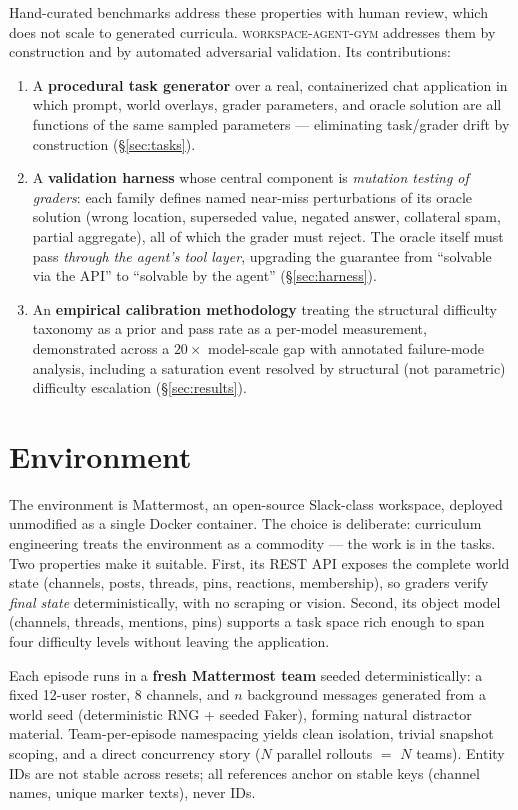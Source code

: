 \documentclass[10pt]{article}
\begin{document}
Hand-curated benchmarks address these properties with human review, which does not scale to generated curricula. \textsc{workspace-agent-gym} addresses them by construction and by automated adversarial validation. Its contributions:

\begin{enumerate}\itemsep0.15em
  \item A \textbf{procedural task generator} over a real, containerized chat application in which prompt, world overlays, grader parameters, and oracle solution are all functions of the same sampled parameters --- eliminating task/grader drift by construction (\S\ref{sec:tasks}).
  \item A \textbf{validation harness} whose central component is \emph{mutation testing of graders}: each family defines named near-miss perturbations of its oracle solution (wrong location, superseded value, negated answer, collateral spam, partial aggregate), all of which the grader must reject. The oracle itself must pass \emph{through the agent's tool layer}, upgrading the guarantee from ``solvable via the API'' to ``solvable by the agent'' (\S\ref{sec:harness}).
  \item An \textbf{empirical calibration methodology} treating the structural difficulty taxonomy as a prior and pass rate as a per-model measurement, demonstrated across a $20\times$ model-scale gap with annotated failure-mode analysis, including a saturation event resolved by structural (not parametric) difficulty escalation (\S\ref{sec:results}).
\end{enumerate}

\section{Environment}

The environment is Mattermost, an open-source Slack-class workspace, deployed unmodified as a single Docker container. The choice is deliberate: curriculum engineering treats the environment as a commodity --- the work is in the tasks. Two properties make it suitable. First, its REST API exposes the complete world state (channels, posts, threads, pins, reactions, membership), so graders verify \emph{final state} deterministically, with no scraping or vision. Second, its object model (channels, threads, mentions, pins) supports a task space rich enough to span four difficulty levels without leaving the application.

Each episode runs in a \textbf{fresh Mattermost team} seeded deterministically: a fixed 12-user roster, 8 channels, and $n$ background messages generated from a world seed (deterministic RNG + seeded Faker), forming natural distractor material. Team-per-episode namespacing yields clean isolation, trivial snapshot scoping, and a direct concurrency story ($N$ parallel rollouts $=$ $N$ teams). Entity IDs are not stable across resets; all references anchor on stable keys (channel names, unique marker texts), never IDs.
\end{document}

